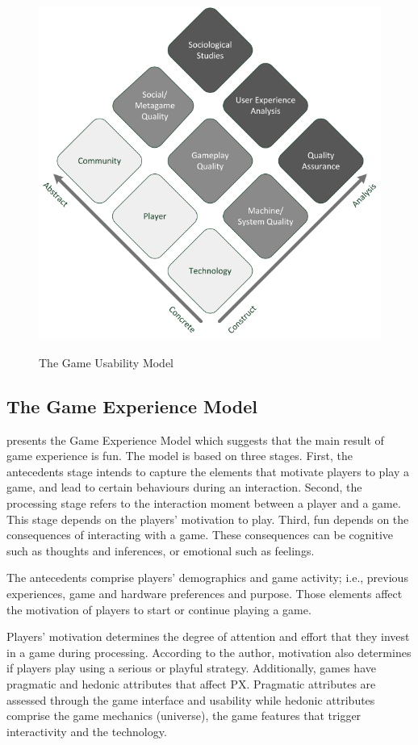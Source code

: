 \begin{figure}[bth]
\myfloatalign
{\includegraphics[width=.6\linewidth]{gfx/model/game_usa_model}} \quad
\caption[The Game Usability Model]{The Game Usability Model \autocite{Nacked}}\label{fig:game_usa_model}
\end{figure}

\subsection{The Game Experience Model}
\textcite{Fernandez2008} presents the Game Experience Model which suggests that the main result of game experience is fun. The model is based on three stages. First, the antecedents stage intends to capture the elements that motivate players to play a game, and lead to certain behaviours during an interaction. Second, the processing stage refers to the interaction moment between a player and a game. This stage depends on the players' motivation to play. Third, fun depends on the consequences of interacting with a game. These consequences can be cognitive such as thoughts and inferences, or emotional such as feelings.

The antecedents comprise players' demographics and game activity; i.e., previous experiences, game and hardware preferences and purpose. Those elements affect the motivation of players to start or continue playing a game.

Players' motivation determines the degree of attention and effort that they invest in a game during processing. According to the author, motivation also determines if players play using a serious or playful strategy. Additionally, games have pragmatic and hedonic attributes that affect \ac{PX}. Pragmatic attributes are assessed through the game interface and usability while hedonic attributes comprise the game mechanics (universe), the game features that trigger interactivity and the technology.

